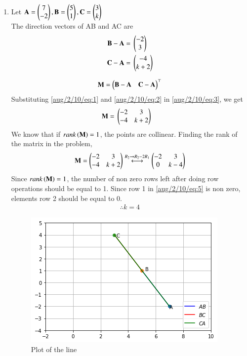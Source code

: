 
\begin{enumerate}
\item Let $\mathbf{A}=\begin{pmatrix}7\\-2\end{pmatrix}, \mathbf{B}=\begin{pmatrix}5 \\ 1\end{pmatrix}, \mathbf{C}=\begin{pmatrix}3 \\ k\end{pmatrix}$\\
The direction vectors of AB and AC are
\begin{align}
\label{aug/2/10/eq:1}
\mathbf{B} - \mathbf{A} ={}& \begin{pmatrix}-2 \\ 3\end{pmatrix}\\
\label{aug/2/10/eq:2}
\mathbf{C} - \mathbf{A} ={}& \begin{pmatrix}-4 \\ k+2\end{pmatrix}
\end{align}

\begin{align}
\label{aug/2/10/eq:3}
\mathbf{M} =\begin{pmatrix}\mathbf{B}-\mathbf{A} & \mathbf{C}-\mathbf{A}\end{pmatrix}^\top
\end{align}
Substituting \eqref{aug/2/10/eq:1} and \eqref{aug/2/10/eq:2} in \eqref{aug/2/10/eq:3}, we get
\begin{align}
\label{aug/2/10/eq:4}
\mathbf{M}={}&\begin{pmatrix}-2 & 3 \\ -4 & k+2\end{pmatrix}
\end{align}
We know that if $rank\left(\mathbf{M}\right)=1$, the points are collinear.
Finding the rank of the matrix in the problem,
\begin{align}
\label{aug/2/10/eq:5}
\mathbf{M} = \begin{pmatrix}-2 & 3 \\ -4 & k+2\end{pmatrix} \overset{R_{2}\rightarrow R_{2}-2R_{1}}{\longleftrightarrow} \begin{pmatrix}-2 & 3 \\ 0 & k-4\end{pmatrix}
\end{align}
Since $rank\left(\mathbf{M}\right)=1$, the number of non zero rows left after doing row operations should be equal to 1.
Since row 1 in \eqref{aug/2/10/eq:5} is non zero, elements row 2 should be equal to 0.
\begin{align}
\therefore k=4
\end{align}
\begin{figure}[!h]
\centering
\includegraphics[width=\columnwidth]{solutions/aug/2/10/Figures/q1a.png}
\caption{Plot of the line}
\end{figure}




\end{enumerate}
